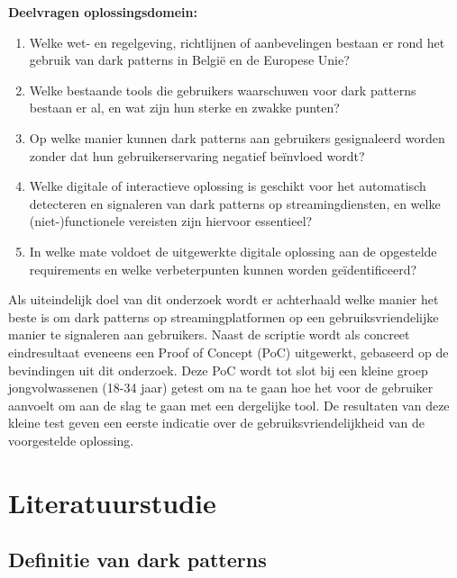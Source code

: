 \noindent
\textbf{Deelvragen oplossingsdomein:}
\begin{enumerate}
    \item Welke wet- en regelgeving, richtlijnen of aanbevelingen bestaan er rond het gebruik van dark patterns in België en de Europese Unie?
    \item Welke bestaande tools die gebruikers waarschuwen voor dark patterns bestaan er al, en wat zijn hun sterke en zwakke punten?
    \item Op welke manier kunnen dark patterns aan gebruikers gesignaleerd worden zonder dat hun gebruikerservaring negatief beïnvloed wordt?
    \item Welke digitale of interactieve oplossing is geschikt voor het automatisch detecteren en signaleren van dark patterns op streamingdiensten, en welke (niet-)functionele vereisten zijn hiervoor essentieel?
    \item In welke mate voldoet de uitgewerkte digitale oplossing aan de opgestelde requirements en welke verbeterpunten kunnen worden geïdentificeerd?
\end{enumerate}

\vspace{1em}

Als uiteindelijk doel van dit onderzoek wordt er achterhaald welke manier het beste is om dark patterns op streamingplatformen op een gebruiksvriendelijke manier te signaleren aan gebruikers. Naast de scriptie wordt als concreet eindresultaat eveneens een Proof of Concept (PoC) uitgewerkt, gebaseerd op de bevindingen uit dit onderzoek. Deze PoC wordt tot slot bij een kleine groep jongvolwassenen (18-34 jaar) getest om na te gaan hoe het voor de gebruiker aanvoelt om aan de slag te gaan met een dergelijke tool. De resultaten van deze kleine test geven een eerste indicatie over de gebruiksvriendelijkheid van de voorgestelde oplossing.

\vspace{1em}


\section{Literatuurstudie}%
\label{sec:literatuurstudie}

\subsection{Definitie van dark patterns}
\label{subsec:definitie}

